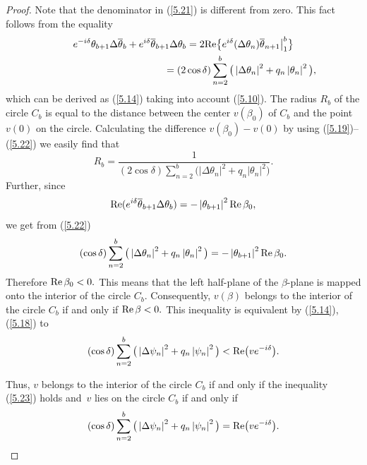 \documentclass[pdftex]{sigma}
\numberwithin{equation}{section}
\begin{document}
\begin{proof}
Note that the denominator in (\ref{5.21}) is dif\/ferent from zero. This fact
follows from the equality%
\begin{gather}
e^{-i\delta }\theta _{b+1}\Delta \overline{\theta }_{b}+e^{i\delta }%
\overline{\theta }_{b+1}\Delta \theta _{b}=2{\rm Re}\big\{ e^{i\delta
}(\Delta \theta _{n})\overline{\theta }_{n+1}\big|_{1}^{b}\big\}\nonumber\\
\phantom{e^{-i\delta }\theta _{b+1}\Delta \overline{\theta }_{b}+e^{i\delta }%
\overline{\theta }_{b+1}\Delta \theta _{b}}{}
=(2\cos \delta )\sum_{n=2}^{b}\big( \left\vert \Delta \theta
_{n}\right\vert ^{2}+q_{n}\left\vert \theta _{n}\right\vert ^{2}\big),
\label{5.22}
\end{gather}%
which can be derived as (\ref{5.14}) taking into account (\ref{5.10}). The
radius $R_{b}$ of the circle $C_{b}$ is equal to the distance between the
center $v(\beta _{0})$ of $C_{b}$ and the point $v(0)$ on the circle.
Calculating the dif\/ference $v(\beta _{0})-v(0)$ by using (\ref{5.19})--(\ref{5.22}) we easily f\/ind that%
\[
R_{b}=\frac{1}{(2\cos \delta )\sum\limits_{n=2}^{b}\big( \left\vert \Delta \theta
_{n}\right\vert ^{2}+q_{n}\left\vert \theta _{n}\right\vert ^{2}\big) }.
\]%
Further, since%
\[
{\rm Re}(e^{i\delta }\overline{\theta }_{b+1}\Delta \theta
_{b})=-\left\vert \theta _{b+1}\right\vert ^{2}{\rm Re}\,\beta _{0},
\]%
we get from (\ref{5.22})%
\[
(\cos \delta )\sum_{n=2}^{b}\big( \left\vert \Delta \theta _{n}\right\vert
^{2}+q_{n}\left\vert \theta _{n}\right\vert ^{2}\big) =-\left\vert \theta
_{b+1}\right\vert ^{2}{\rm Re}\, \beta _{0}.
\]%
Therefore ${\rm Re}\,\beta _{0}<0.$ This means that the left half-plane of
the $\beta $-plane is mapped onto the interior of the circle $C_{b}.$
Consequently, $v(\beta )$ belongs to the interior of the circle $C_{b}$ if
and only if ${\rm Re}\,\beta <0.$ This inequality is equivalent by (\ref{5.14}), (\ref{5.18}) to%
\begin{equation}
(\cos \delta )\sum_{n=2}^{b}\big( \left\vert \Delta \psi _{n}\right\vert
^{2}+q_{n}\left\vert \psi _{n}\right\vert ^{2}\big) <{\rm Re}\big(ve^{-i\delta }\big).  \label{5.23}
\end{equation}

Thus, $v$ belongs to the interior of the circle $C_{b}$ if and only if the
inequality (\ref{5.23}) holds and~$v$ lies on the circle $C_{b}$ if and only
if%
\[
(\cos \delta )\sum_{n=2}^{b}\big( \left\vert \Delta \psi _{n}\right\vert
^{2}+q_{n}\left\vert \psi _{n}\right\vert ^{2}\big) ={\rm Re}
\big(ve^{-i\delta }\big).
\]


\end{proof}
\end{document}
